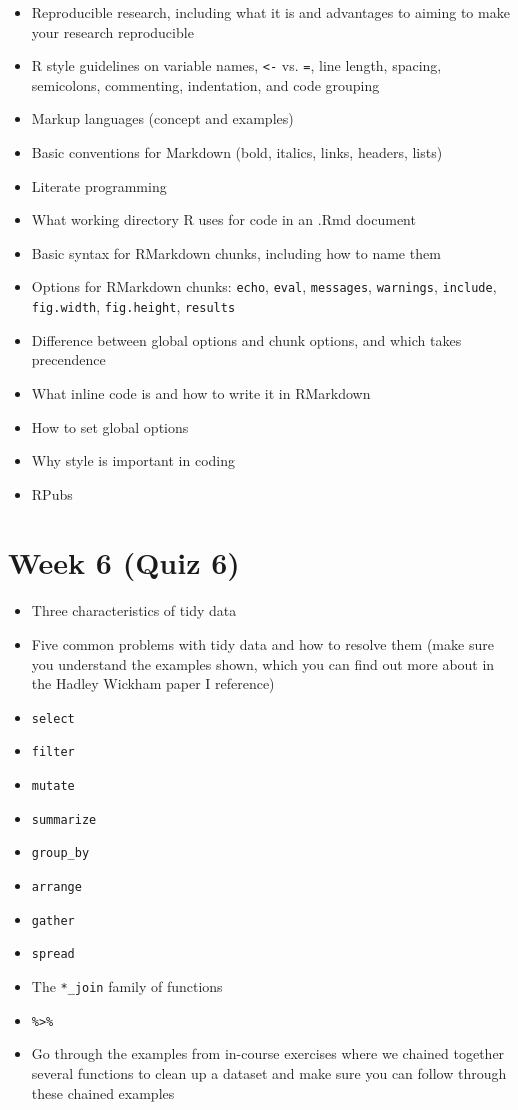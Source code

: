 \documentclass[]{book}
\providecommand{\tightlist}{%
  \setlength{\itemsep}{0pt}\setlength{\parskip}{0pt}}
\theoremstyle{definition}
\theoremstyle{definition}
\theoremstyle{definition}
\theoremstyle{remark}
\begin{document}
\begin{itemize}
\tightlist
\item
  Reproducible research, including what it is and advantages to aiming
  to make your research reproducible
\item
  R style guidelines on variable names, \texttt{\textless{}-} vs.
  \texttt{=}, line length, spacing, semicolons, commenting, indentation,
  and code grouping
\item
  Markup languages (concept and examples)
\item
  Basic conventions for Markdown (bold, italics, links, headers, lists)
\item
  Literate programming
\item
  What working directory R uses for code in an .Rmd document
\item
  Basic syntax for RMarkdown chunks, including how to name them
\item
  Options for RMarkdown chunks: \texttt{echo}, \texttt{eval},
  \texttt{messages}, \texttt{warnings}, \texttt{include},
  \texttt{fig.width}, \texttt{fig.height}, \texttt{results}
\item
  Difference between global options and chunk options, and which takes
  precendence
\item
  What inline code is and how to write it in RMarkdown
\item
  How to set global options
\item
  Why style is important in coding
\item
  RPubs
\end{itemize}

\section{Week 6 (Quiz 6)}\label{week-6-quiz-6}

\begin{itemize}
\tightlist
\item
  Three characteristics of tidy data
\item
  Five common problems with tidy data and how to resolve them (make sure
  you understand the examples shown, which you can find out more about
  in the Hadley Wickham paper I reference)
\item
  \texttt{select}
\item
  \texttt{filter}
\item
  \texttt{mutate}
\item
  \texttt{summarize}
\item
  \texttt{group\_by}
\item
  \texttt{arrange}
\item
  \texttt{gather}
\item
  \texttt{spread}
\item
  The \texttt{*\_join} family of functions
\item
  \texttt{\%\textgreater{}\%}
\item
  Go through the examples from in-course exercises where we chained
  together several functions to clean up a dataset and make sure you can
  follow through these chained examples
\end{itemize}
\end{document}
